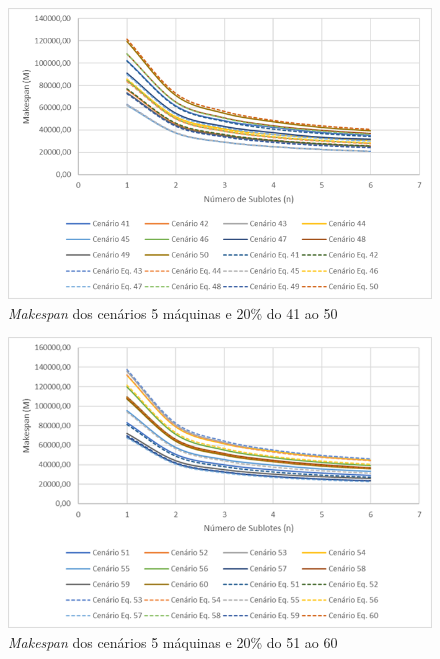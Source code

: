 \begin{figure}[H]
    \centering
    \includegraphics[width=13cm]{Apendices/Figuras/05m20_41-50}
    \caption{\textit{Makespan} dos cenários 5 máquinas e 20\% do 41 ao 50}
    \label{fig:05m20_41-50}
\end{figure}

\begin{figure}[H]
    \centering
    \includegraphics[width=13cm]{Apendices/Figuras/05m20_51-60}
    \caption{\textit{Makespan} dos cenários 5 máquinas e 20\% do 51 ao 60}
    \label{fig:05m20_51-60}
\end{figure}

